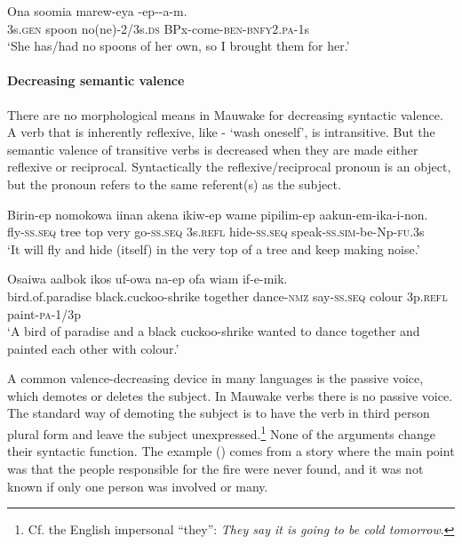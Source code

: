 \ea%
\label{ex:x1008}
\gll Ona soomia marew-eya -ep--a-m. \\
3s.\textsc{gen} spoon no(ne)-2/3s.\textsc{ds} BPx-come-\textsc{ben}-\textsc{bnfy}2.\textsc{pa}-1s\\
\glt`She has/had no spoons of her own, so I brought them for her.'
\z

\paragraph[Decreasing semantic valence]{Decreasing semantic valence}
{}
There are no morphological means in Mauwake for decreasing syntactic valence. A verb that is inherently reflexive, like - `wash oneself', is intransitive. But the semantic valence of transitive verbs is decreased when they are made either reflexive or reciprocal. Syntactically the reflexive/reciprocal pronoun is an object, but the pronoun refers to the same referent(s) as the subject. 

\ea%
\label{ex:x1834}
\gll Birin-ep nomokowa iinan akena ikiw-ep wame pipilim-ep aakun-em-ika-i-non.\\
fly-\textsc{ss}.\textsc{seq} tree top very go-\textsc{ss}.\textsc{seq} 3s.\textsc{refl} hide-\textsc{ss}.\textsc{seq} speak-\textsc{ss}.\textsc{sim}-be-Np-\textsc{fu}.3s\\
\glt`It will fly and hide (itself) in the very top of a tree and keep making noise.'
\z

\ea%
\label{ex:x1835}
\gll Osaiwa aalbok ikos uf-owa na-ep ofa wiam if-e-mik.\\
bird.of.paradise black.cuckoo-shrike together dance-\textsc{nmz} say-\textsc{ss}.\textsc{seq} colour 3p.\textsc{refl} paint-\textsc{pa}-1/3p\\
\glt`A bird of paradise and a black cuckoo-shrike wanted to dance together and painted each other with colour.'
\z

A common valence-decreasing device in many languages is the passive voice, which demotes or deletes the subject. In Mauwake verbs there is no passive voice. The standard way of demoting the subject is to have the verb in third person plural form and leave the subject  unexpressed.\footnote{Cf. the English impersonal ``they'': \textit{They say it is going to be cold tomorrow}.} None of the arguments change their syntactic function. The example () comes from a story where the main point was that the people responsible for the fire were never found, and it was not known if only one person was involved or many. 

